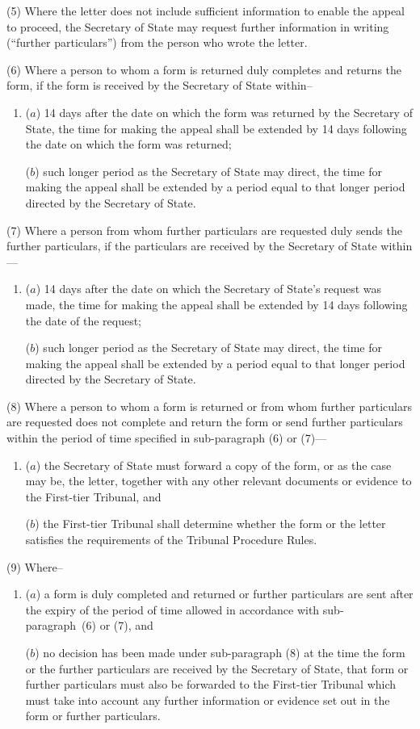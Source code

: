 \documentclass[12pt,a4paper]{article}
\begin{document}
(5) Where the letter does not include sufficient information to enable the appeal to proceed, the Secretary of State may request further information in writing (“further particulars”) from the person who wrote the letter.

(6) Where a person to whom a form is returned duly completes and returns the form, if the form is received by the Secretary of State within–
\begin{enumerate}\item[]
($a$) 14 days after the date on which the form was returned by the Secretary of State, the time for making the appeal shall be extended by 14 days following the date on which the form was returned;

($b$) such longer period as the Secretary of State may direct, the time for making the appeal shall be extended by a period equal to that longer period directed by the Secretary of State.
\end{enumerate}

(7) Where a person from whom further particulars are requested duly sends the further particulars, if the particulars are received by the Secretary of State within—
\begin{enumerate}\item[]
($a$) 14 days after the date on which the Secretary of State’s request was made, the time for making the appeal shall be extended by 14 days following the date of the request;

($b$) such longer period as the Secretary of State may direct, the time for making the appeal shall be extended by a period equal to that longer period directed by the Secretary of State.
\end{enumerate}

(8) Where a person to whom a form is returned or from whom further particulars are requested does not complete and return the form or send further particulars within the period of time specified in sub-paragraph (6) or (7)—
\begin{enumerate}\item[]
($a$) the Secretary of State must forward a copy of the form, or as the case may be, the letter, together with any other relevant documents or evidence to the First-tier Tribunal, and

($b$) the First-tier Tribunal shall determine whether the form or the letter satisfies the requirements of the Tribunal Procedure Rules.
\end{enumerate}

(9) Where–
\begin{enumerate}\item[]
($a$) a form is duly completed and returned or further particulars are sent after the expiry of the period of time allowed in accordance with sub-paragraph~(6) or (7), and

($b$) no decision has been made under sub-paragraph (8) at the time the form or the further particulars are received by the Secretary of State, that form or further particulars must also be forwarded to the First-tier Tribunal which must take into account any further information or evidence set out in the form or further particulars.
\end{enumerate}
\end{document}
